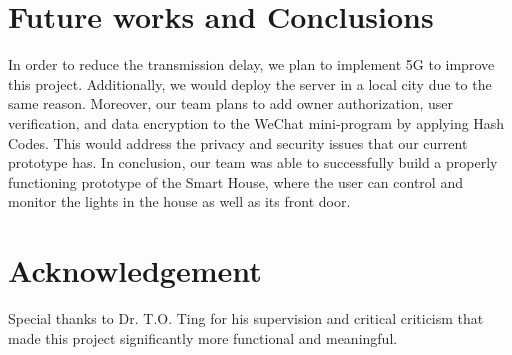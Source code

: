 \documentclass[a0,portrait]{a0poster}
\begin{document}
\begin{multicols}{2}

\color{SaddleBrown} %

\section*{Future works and Conclusions}
\Large
In order to reduce the transmission delay, we plan to implement 5G to improve this project. Additionally, we would deploy the server in a local city due to the same reason. Moreover, our team plans to add owner authorization, user verification, and data encryption to the WeChat mini-program by applying Hash Codes. This would address the privacy and security issues that our current prototype has.
In conclusion, our team was able to successfully build a properly functioning prototype of the Smart House, where the user can control and monitor the lights in the house as well as its front door.

\color{DarkSlateGray} %


\nocite{*} %


\section*{Acknowledgement}
\large

Special thanks to Dr. T.O. Ting for his supervision and critical criticism that made this project significantly more functional and meaningful.


\end{multicols}
\end{document}
